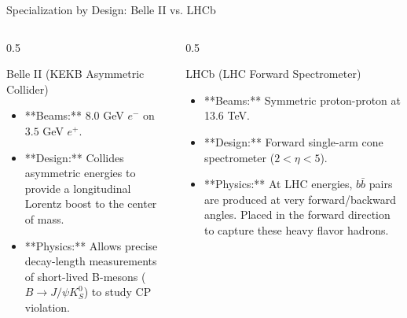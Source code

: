 \documentclass[aspectratio=169]{beamer}
\begin{document}
\begin{frame}{Specialization by Design: Belle II vs. LHCb}
    \begin{columns}
        \begin{column}{0.5\textwidth}
            \begin{block}{Belle II (KEKB Asymmetric Collider)}
                \begin{itemize}
                    \item **Beams:** $8.0$ GeV $e^-$ on $3.5$ GeV $e^+$.
                    \item **Design:** Collides asymmetric energies to provide a longitudinal Lorentz boost to the center of mass.
                    \item **Physics:** Allows precise decay-length measurements of short-lived B-mesons ($B \rightarrow J/\psi K_S^0$) to study CP violation.
                \end{itemize}
            \end{block}
        \end{column}
        \begin{column}{0.5\textwidth}
            \begin{block}{LHCb (LHC Forward Spectrometer)}
                \begin{itemize}
                    \item **Beams:** Symmetric proton-proton at 13.6 TeV.
                    \item **Design:** Forward single-arm cone spectrometer ($2 < \eta < 5$).
                    \item **Physics:** At LHC energies, $b\bar{b}$ pairs are produced at very forward/backward angles. Placed in the forward direction to capture these heavy flavor hadrons.
                \end{itemize}
            \end{block}
        \end{column}
    \end{columns}
\end{frame}
\end{document}
